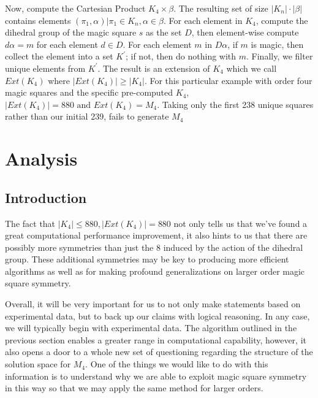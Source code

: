 \documentclass[12pt]{report}
\begin{document}
\par Now, compute the Cartesian Product $K_4 \times \beta$. The resulting set of size $\left|K_n
  \right|\cdot \left|\beta \right|$ contains elements $\left(\pi_1, \alpha\right)\vert \pi_1\in
  K_n, \alpha\in \beta$.
For each element in $K_4$, compute the dihedral group of the magic square $s$ as the set $D$, then
element-wise compute $d\alpha=m$ for each element $d\in D$. For each element $m$ in $D\alpha$, if
$m$ is
magic, then collect the element into a set $K^\prime$; if not, then do nothing with $m$. Finally,
we filter unique elements from $K^\prime$. The result is an extension of $K_4$ which we call
$Ext\left(K_4\right)$ where $\left|Ext\left(K_4\right) \right|\geq \left|K_4 \right|$. For this
particular example with order four magic squares and the specific pre-computed $K_4$,
$\left|Ext\left(K_4\right) \right|=880 \text{ and } Ext\left(K_4\right)=M_4$. Taking only the first
238 unique squares rather than our initial 239, fails to generate $M_4$

\chapter{Analysis}

\section{Introduction} The fact that $\left|K_4\right|\leq 880, \left|Ext\left(K_4
  \right)\right|=880$ not only tells us that we've found a great computational performance
improvement, it also hints to us that there are possibly more symmetries than just the 8 induced by
the action of the dihedral group. These additional symmetries may be key to producing more
efficient algorithms as well as for making profound generalizations on larger order magic square
symmetry.

\par Overall, it will be very important for us to not only make statements based on experimental
data, but to back up our claims with logical reasoning. In any case, we will typically begin with
experimental data. The algorithm outlined in the previous section enables a greater range in
computational capability, however, it also opens a door to a whole new set of questioning regarding
the structure of the solution space for $M_4$. One of the things we would like to do with this
information is to understand why we are able to exploit magic square symmetry in this way so that
we may apply the same method for larger orders.
\end{document}
